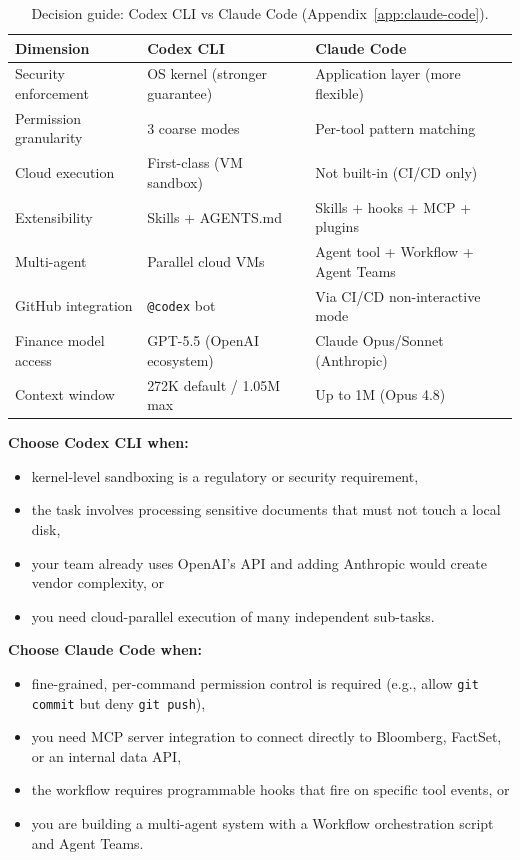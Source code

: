 \begin{table}[ht]
\centering
\caption{Decision guide: Codex CLI vs Claude Code (Appendix~\ref{app:claude-code}).}
\label{tab:codex-vs-claude}
\begin{tabular}{lll}
\toprule
\textbf{Dimension} & \textbf{Codex CLI} & \textbf{Claude Code} \\
\midrule
Security enforcement  & OS kernel (stronger guarantee)   & Application layer (more flexible) \\
Permission granularity & 3 coarse modes                  & Per-tool pattern matching \\
Cloud execution       & First-class (VM sandbox)         & Not built-in (CI/CD only) \\
Extensibility         & Skills + AGENTS.md               & Skills + hooks + MCP + plugins \\
Multi-agent           & Parallel cloud VMs               & Agent tool + Workflow + Agent Teams \\
GitHub integration    & \texttt{@codex} bot              & Via CI/CD non-interactive mode \\
Finance model access  & GPT-5.5 (OpenAI ecosystem)       & Claude Opus/Sonnet (Anthropic) \\
Context window        & 272K default / 1.05M max         & Up to 1M (Opus 4.8) \\
\bottomrule
\end{tabular}
\end{table}

\textbf{Choose Codex CLI when:}
\begin{itemize}
  \item kernel-level sandboxing is a regulatory or security requirement,
  \item the task involves processing sensitive documents that must not touch a
        local disk,
  \item your team already uses OpenAI's API and adding Anthropic would create
        vendor complexity, or
  \item you need cloud-parallel execution of many independent sub-tasks.
\end{itemize}

\textbf{Choose Claude Code when:}
\begin{itemize}
  \item fine-grained, per-command permission control is required (e.g.,
        allow \texttt{git commit} but deny \texttt{git push}),
  \item you need MCP server integration to connect directly to Bloomberg,
        FactSet, or an internal data API,
  \item the workflow requires programmable hooks that fire on specific tool
        events, or
  \item you are building a multi-agent system with a Workflow orchestration
        script and Agent Teams.
\end{itemize}

